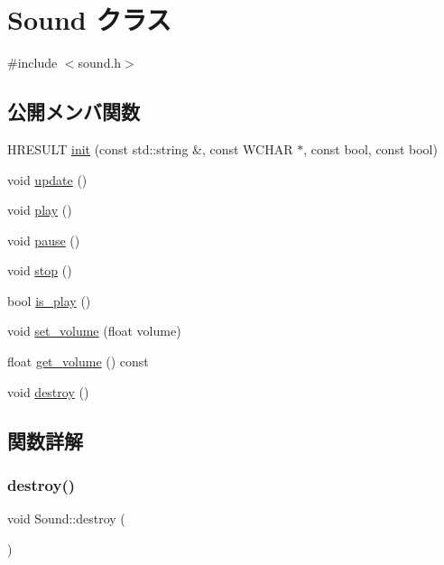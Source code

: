 \hypertarget{class_sound}{}\section{Sound クラス}
\label{class_sound}


{\ttfamily \#include $<$sound.\+h$>$}

\subsection*{公開メンバ関数}
\begin{DoxyCompactItemize}
\item 
H\+R\+E\+S\+U\+LT \mbox{\hyperlink{class_sound_ab8fa1a127fa7364b3d05708eb04eec79}{init}} (const std\+::string \&, const W\+C\+H\+AR $\ast$, const bool, const bool)
\item 
void \mbox{\hyperlink{class_sound_a1363950fc24a88df0c358f453843b80c}{update}} ()
\item 
void \mbox{\hyperlink{class_sound_aad595b0dc5459e110b53a4e6b2adb0e4}{play}} ()
\item 
void \mbox{\hyperlink{class_sound_a65b0f66e9123caed2809da366ac4d377}{pause}} ()
\item 
void \mbox{\hyperlink{class_sound_a07c551ab56d2f83a861a2f7fd81b480a}{stop}} ()
\item 
bool \mbox{\hyperlink{class_sound_af4307ce8def4e623153e6208951ca8bc}{is\+\_\+play}} ()
\item 
void \mbox{\hyperlink{class_sound_a42d01b791f788544ecc5d59fc25a1c28}{set\+\_\+volume}} (float volume)
\item 
float \mbox{\hyperlink{class_sound_af5564dbb59b33f316b74a765122a3257}{get\+\_\+volume}} () const
\item 
void \mbox{\hyperlink{class_sound_a5f55f796149d7a4003cf7d98887893cf}{destroy}} ()
\end{DoxyCompactItemize}


\subsection{関数詳解}
\mbox{\label{class_sound_a5f55f796149d7a4003cf7d98887893cf}} 
\subsubsection{\texorpdfstring{destroy()}{destroy()}}
{\footnotesize\ttfamily void Sound\+::destroy (\begin{DoxyParamCaption}{ }\end{DoxyParamCaption})\hspace{0.3cm}{\ttfamily [inline]}}

